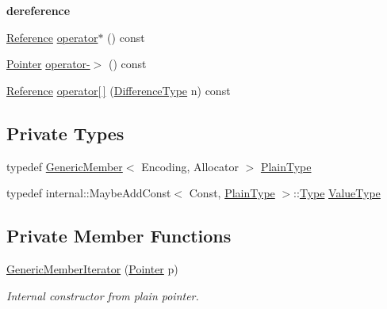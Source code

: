 \begin{Indent}\textbf{ dereference}\par
\begin{DoxyCompactItemize}
\item 
\hyperlink{classGenericMemberIterator_a8042a85a9e233d65de5b6c66d9a1109a}{Reference} \hyperlink{classGenericMemberIterator_a56ad403f7e7a35d6060931685d6cbbe8}{operator$\ast$} () const
\item 
\hyperlink{classGenericMemberIterator_ac0bd6e77617593892fc13afb00e62f29}{Pointer} \hyperlink{classGenericMemberIterator_abc95a8e52653a8baa2927b03239f4be9}{operator-\/$>$} () const
\item 
\hyperlink{classGenericMemberIterator_a8042a85a9e233d65de5b6c66d9a1109a}{Reference} \hyperlink{classGenericMemberIterator_a41b59f1bd367a98ee5d1138cc81e98a7}{operator\mbox{[}$\,$\mbox{]}} (\hyperlink{classGenericMemberIterator_aaa13c83e6e0d1f5b413d62cacd8f6a2e}{Difference\+Type} n) const
\end{DoxyCompactItemize}
\end{Indent}
\subsection*{Private Types}
\begin{DoxyCompactItemize}
\item 
typedef \hyperlink{classGenericMember}{Generic\+Member}$<$ Encoding, Allocator $>$ \hyperlink{classGenericMemberIterator_ac0d50d12ba074e68837964244668c66b}{Plain\+Type}
\item 
typedef internal\+::\+Maybe\+Add\+Const$<$ Const, \hyperlink{classGenericMemberIterator_ac0d50d12ba074e68837964244668c66b}{Plain\+Type} $>$\+::\hyperlink{rapidjson_8h_a1d1cfd8ffb84e947f82999c682b666a7}{Type} \hyperlink{classGenericMemberIterator_a1323c9d064a9c388a1eb62a6e2c17584}{Value\+Type}
\end{DoxyCompactItemize}
\subsection*{Private Member Functions}
\begin{DoxyCompactItemize}
\item 
\hyperlink{classGenericMemberIterator_a76c372cd90c8abff942ab054c4992c74}{Generic\+Member\+Iterator} (\hyperlink{classGenericMemberIterator_ac0bd6e77617593892fc13afb00e62f29}{Pointer} p)
\begin{DoxyCompactList}\small\item\em Internal constructor from plain pointer. \end{DoxyCompactList}\end{DoxyCompactItemize}
